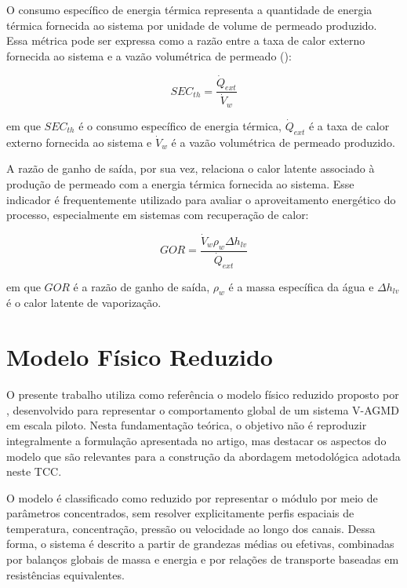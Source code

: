 O consumo específico de energia térmica representa a quantidade de energia térmica fornecida ao sistema por unidade de volume de permeado produzido. Essa métrica pode ser expressa como a razão entre a taxa de calor externo fornecida ao sistema e a vazão volumétrica de permeado (\cite{curcino2023}):

\begin{equation}
SEC_{th} = \frac{\dot{Q}_{ext}}{\dot{V}_{w}}
\end{equation}

\noindent em que \(SEC_{th}\) é o consumo específico de energia térmica, \(\dot{Q}_{ext}\) é a taxa de calor externo fornecida ao sistema e \(\dot{V}_{w}\) é a vazão volumétrica de permeado produzido.

A razão de ganho de saída, por sua vez, relaciona o calor latente associado à produção de permeado com a energia térmica fornecida ao sistema. Esse indicador é frequentemente utilizado para avaliar o aproveitamento energético do processo, especialmente em sistemas com recuperação de calor:

\begin{equation}
GOR = \frac{\dot{V}_w \rho_w \Delta h_{lv}}{\dot{Q}_{ext}}
\end{equation}

\noindent em que \(GOR\) é a razão de ganho de saída, \(\rho_w\) é a massa específica da água e \(\Delta h_{lv}\) é o calor latente de vaporização.

\section{Modelo Físico Reduzido}

O presente trabalho utiliza como referência o modelo físico reduzido proposto por \cite{Lisboa2024}, desenvolvido para representar o comportamento global de um sistema V-AGMD em escala piloto. Nesta fundamentação teórica, o objetivo não é reproduzir integralmente a formulação apresentada no artigo, mas destacar os aspectos do modelo que são relevantes para a construção da abordagem metodológica adotada neste TCC.

O modelo é classificado como reduzido por representar o módulo por meio de parâmetros concentrados, sem resolver explicitamente perfis espaciais de temperatura, concentração, pressão ou velocidade ao longo dos canais. Dessa forma, o sistema é descrito a partir de grandezas médias ou efetivas, combinadas por balanços globais de massa e energia e por relações de transporte baseadas em resistências equivalentes.

